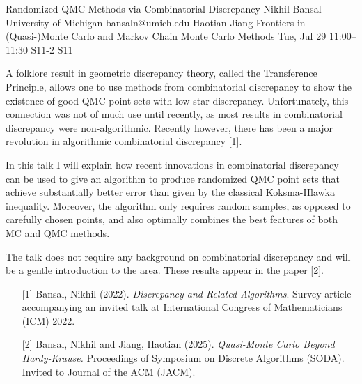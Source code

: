 \begin{talk}
  {Randomized QMC Methods via Combinatorial Discrepancy}%
  {Nikhil Bansal}%
  {University of Michigan}%
  {bansaln@umich.edu}%
  {Haotian Jiang}%
  {Frontiers in (Quasi-)Monte Carlo and Markov Chain Monte Carlo Methods}%
  {Tue, Jul 29 11:00–11:30}%
  {S11-2}%
  {S11}%
				

A folklore result in geometric discrepancy theory, called the Transference Principle, allows one to use methods from combinatorial discrepancy to show the existence of good QMC point sets with low star discrepancy.
Unfortunately, this connection was not of much use until recently, as most results in combinatorial discrepancy were non-algorithmic. Recently however, there has been a major revolution in algorithmic combinatorial discrepancy [1]. 

In this talk I will explain how recent innovations in combinatorial discrepancy can be used to give an algorithm to produce randomized QMC point sets that  achieve substantially better error than given by the classical Koksma-Hlawka inequality. Moreover, the algorithm only requires random samples, as opposed to carefully chosen points, and also optimally combines the best features of both MC and QMC methods.  

 

The talk does not require any background on combinatorial discrepancy and will be a gentle introduction to the area. 
These results appear in the paper [2].

\medskip

\begin{enumerate}
	\item[{[1]}] Bansal, Nikhil (2022). {\it Discrepancy and Related Algorithms}. Survey article accompanying an invited talk at 
     International Congress of Mathematicians (ICM) 2022.
     
	\item[{[2]}]  Bansal, Nikhil and Jiang, Haotian (2025). {\em Quasi-Monte Carlo Beyond Hardy-Krause.} Proceedings of Symposium on Discrete Algorithms (SODA). Invited to Journal of the ACM (JACM). 
\end{enumerate}
\end{talk}

